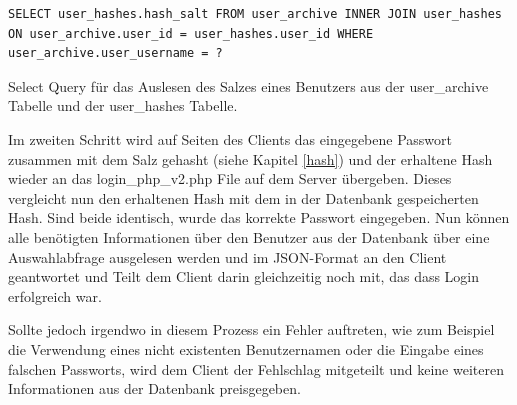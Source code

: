 \documentclass[a4paper,11pt]{report}
\newenvironment{code}{\captionsetup{type=figure}}{}
\begin{document}
					\begin{code}
						\begin{center}
							\begin{verbatim}
SELECT user_hashes.hash_salt FROM user_archive INNER JOIN user_hashes ON user_archive.user_id = user_hashes.user_id WHERE user_archive.user_username = ?
							\end{verbatim}
						\end{center}
					\caption{Select Query für das Auslesen des Salzes eines Benutzers aus der user\_archive Tabelle und der user\_hashes Tabelle.}\label{SQL:SALT}
					\end{code}
					
					Im zweiten Schritt wird auf Seiten des Clients das eingegebene Passwort zusammen mit dem Salz gehasht (siehe Kapitel \ref{hash}) und der erhaltene Hash wieder an das login\_php\_v2.php File auf dem Server übergeben. Dieses vergleicht nun den erhaltenen Hash mit dem in der Datenbank gespeicherten Hash. Sind beide identisch, wurde das korrekte Passwort eingegeben. Nun können alle benötigten Informationen über den Benutzer aus der Datenbank über eine Auswahlabfrage ausgelesen werden und im JSON-Format an den Client geantwortet und Teilt dem Client darin gleichzeitig noch mit, das dass Login erfolgreich war.
					
					Sollte jedoch irgendwo in diesem Prozess ein Fehler auftreten, wie zum Beispiel die Verwendung eines nicht existenten Benutzernamen oder die Eingabe eines falschen Passworts, wird dem Client der Fehlschlag mitgeteilt und keine weiteren Informationen aus der Datenbank preisgegeben.
					
\end{document}
